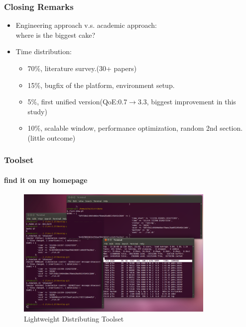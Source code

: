 \documentclass[14pt]{beamer}
\begin{document}
\begin{frame}
\frametitle{Closing Remarks}
	\begin{itemize}
		\item Engineering approach v.s. academic approach:\\
		where is the biggest cake? 
		\item Time distribution:
			\begin{itemize}
				\item 70\%, literature survey.(30+ papers) 
				\item 15\%, bugfix of the platform, environment setup. 
				\item 5\%, first unified version(QoE:0.7$\rightarrow$3.3, 
				biggest improvement in this study)
				\item 10\%, scalable window, performance optimization, random 
				2nd section. (little outcome)
			\end{itemize}
	\end{itemize}
\end{frame}

\begin{frame}
\frametitle{Toolset}
\framesubtitle{find it on my homepage}
\begin{figure}
	\includegraphics[width=0.85\textwidth]{../fig/distri_show.png}
	\caption{Lightweight Distributing Toolset }
\end{figure}
\end{frame}
\end{document}
